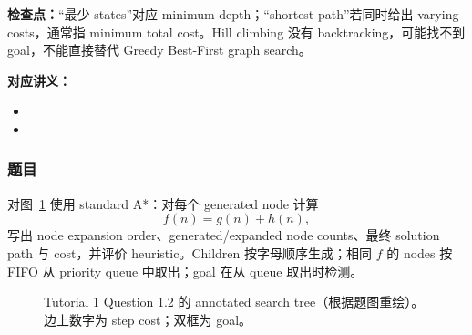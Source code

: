\textbf{检查点：}“最少 states”对应 minimum depth；“shortest path”若同时给出 varying costs，通常指 minimum total cost。Hill climbing 没有 backtracking，可能找不到 goal，不能直接替代 Greedy Best-First graph search。


\textbf{对应讲义：}
\begin{itemize}
  \item {}
  \item {}
\end{itemize}

\subsubsection*{题目}

对图~\ref{fig:sc3000-tut01-search-tree} 使用 standard A*：对每个 generated node 计算
\[
  f(n)=g(n)+h(n),
\]
写出 node expansion order、generated/expanded node counts、最终 solution path 与 cost，并评价 heuristic。Children 按字母顺序生成；相同 $f$ 的 nodes 按 FIFO 从 priority queue 中取出；goal 在从 queue 取出时检测。

\begin{figure}[htbp]
  \centering
  \resizebox{0.98\textwidth}{!}{}
  \caption{Tutorial 1 Question 1.2 的 annotated search tree（根据题图重绘）。边上数字为 step cost；双框为 goal。}
  \label{fig:sc3000-tut01-search-tree}
\end{figure}

